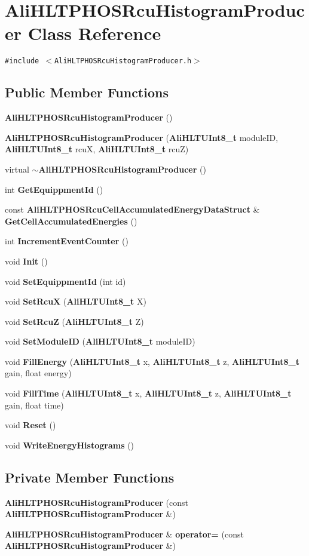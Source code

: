 \section{Ali\-HLTPHOSRcu\-Histogram\-Producer Class Reference}
\label{classAliHLTPHOSRcuHistogramProducer}
{\tt \#include $<$Ali\-HLTPHOSRcu\-Histogram\-Producer.h$>$}

\subsection*{Public Member Functions}
\begin{CompactItemize}
\item 
{\bf Ali\-HLTPHOSRcu\-Histogram\-Producer} ()
\item 
{\bf Ali\-HLTPHOSRcu\-Histogram\-Producer} ({\bf Ali\-HLTUInt8\_\-t} module\-ID, {\bf Ali\-HLTUInt8\_\-t} rcu\-X, {\bf Ali\-HLTUInt8\_\-t} rcu\-Z)
\item 
virtual {\bf $\sim$Ali\-HLTPHOSRcu\-Histogram\-Producer} ()
\item 
int {\bf Get\-Equippment\-Id} ()
\item 
const {\bf Ali\-HLTPHOSRcu\-Cell\-Accumulated\-Energy\-Data\-Struct} \& {\bf Get\-Cell\-Accumulated\-Energies} ()
\item 
int {\bf Increment\-Event\-Counter} ()
\item 
void {\bf Init} ()
\item 
void {\bf Set\-Equippment\-Id} (int id)
\item 
void {\bf Set\-Rcu\-X} ({\bf Ali\-HLTUInt8\_\-t} X)
\item 
void {\bf Set\-Rcu\-Z} ({\bf Ali\-HLTUInt8\_\-t} Z)
\item 
void {\bf Set\-Module\-ID} ({\bf Ali\-HLTUInt8\_\-t} module\-ID)
\item 
void {\bf Fill\-Energy} ({\bf Ali\-HLTUInt8\_\-t} x, {\bf Ali\-HLTUInt8\_\-t} z, {\bf Ali\-HLTUInt8\_\-t} gain, float energy)
\item 
void {\bf Fill\-Time} ({\bf Ali\-HLTUInt8\_\-t} x, {\bf Ali\-HLTUInt8\_\-t} z, {\bf Ali\-HLTUInt8\_\-t} gain, float time)
\item 
void {\bf Reset} ()
\item 
void {\bf Write\-Energy\-Histograms} ()
\end{CompactItemize}
\subsection*{Private Member Functions}
\begin{CompactItemize}
\item 
{\bf Ali\-HLTPHOSRcu\-Histogram\-Producer} (const {\bf Ali\-HLTPHOSRcu\-Histogram\-Producer} \&)
\item 
{\bf Ali\-HLTPHOSRcu\-Histogram\-Producer} \& {\bf operator=} (const {\bf Ali\-HLTPHOSRcu\-Histogram\-Producer} \&)
\end{CompactItemize}
